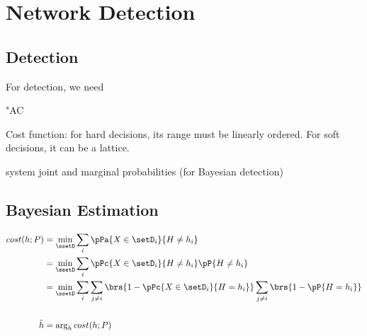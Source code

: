 ﻿%

\chapter{Network Detection}

\section{Detection}
For detection, we need 
\begin{dingautolist}{"AC}
  \item Cost function: for hard decisions, its range must be linearly ordered.
    For soft decisions, it can be a lattice.
  \item system joint and marginal probabilities (for Bayesian detection)
\end{dingautolist}


\section{Bayesian Estimation}
\begin{definition}
\end{definition}

\begin{align*}
  cost(h;P)
    &= \min_\ssetD \sum_i \pPa{X \in \setD_i}{H\ne h_i}
  \\&= \min_\ssetD \sum_i \pPc{X \in \setD_i}{H\ne h_i} \pP{H\ne h_i}
  \\&= \min_\ssetD \sum_i 
                   \sum_{j\ne i}\brs{1-\pPc{X \in \setD_i}{H=h_i}}
                   \sum_{j\ne i}\brs{1-\pP{H=h_i}}
  \\
  \\
  \hat{h}
    &= \arg_h cost(h;P)
\end{align*}





